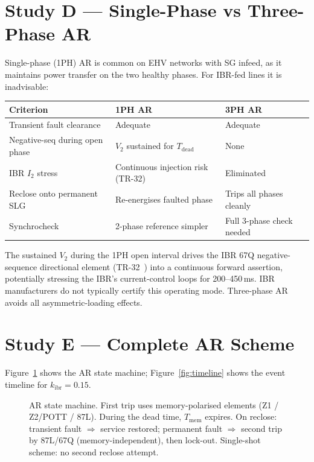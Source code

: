 \documentclass[11pt,a4paper]{article}
\begin{document}
\section{Study D --- Single-Phase vs Three-Phase AR}
\label{sec:studyD}

Single-phase (1PH) AR is common on EHV networks with SG infeed, as it maintains
power transfer on the two healthy phases.  For IBR-fed lines it is inadvisable:

\begin{center}
\begin{tabular}{@{}lll@{}}
\toprule
Criterion & 1PH AR & 3PH AR\\
\midrule
Transient fault clearance & Adequate & Adequate\\
Negative-seq during open phase & $V_2$ sustained for $T_\mathrm{dead}$ & None\\
IBR $I_2$ stress & Continuous injection risk (TR-32) & Eliminated\\
Reclose onto permanent SLG & Re-energises faulted phase & Trips all phases cleanly\\
Synchrocheck & 2-phase reference simpler & Full 3-phase check needed\\
\bottomrule
\end{tabular}
\end{center}

\medskip\noindent
The sustained $V_2$ during the 1PH open interval drives the IBR 67Q negative-
sequence directional element (TR-32~\cite{SAMBP_TR33}) into a continuous
forward assertion, potentially stressing the IBR's current-control loops for
200--450\,ms.  IBR manufacturers do not typically certify this operating mode.
Three-phase AR avoids all asymmetric-loading effects.

\section{Study E --- Complete AR Scheme}
\label{sec:studyE}

Figure~\ref{fig:scheme} shows the AR state machine; Figure~\ref{fig:timeline}
shows the event timeline for $k_\mathrm{ibr}=0.15$.

\begin{figure}[htbp]
  \centering
  \resizebox{0.95\textwidth}{!}{}
  \caption{AR state machine.  First trip uses memory-polarised elements
           (Z1 / Z2/POTT / 87L).  During the dead time, $T_\mathrm{mem}$
           expires.  On reclose: transient fault $\Rightarrow$ service
           restored; permanent fault $\Rightarrow$ second trip by 87L/67Q
           (memory-independent), then lock-out.  Single-shot scheme: no
           second reclose attempt.}
  \label{fig:scheme}
\end{figure}
\end{document}
